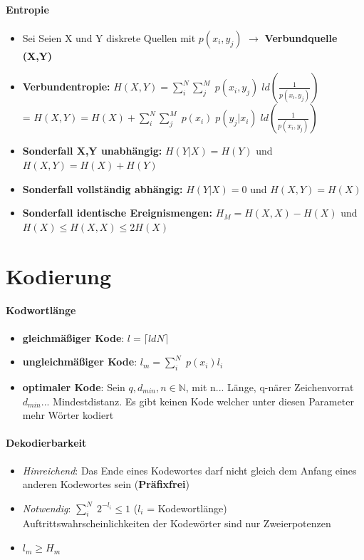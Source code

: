 \documentclass[12pt,a4paper]{article}
\begin{document}
\paragraph{Entropie\\}
\begin{itemize}
\item Sei Seien X und Y diskrete Quellen mit $p(x_i,y_j)$ $\rightarrow$ \textbf{Verbundquelle (X,Y)}
\item \textbf{Verbundentropie:} $H(X,Y) = \sum_i^N \sum_j^M \; p(x_i,y_j) \; ld(\frac{1}{p(x_i,y_j)})$\\
= $H(X,Y) = H(X) + \sum_i^N \sum_j^M \; p(x_i)\; p(y_j\vert x_i) \; ld(\frac{1}{p(x_i,y_j)})$
\item \textbf{Sonderfall X,Y unabhängig:} $H(Y\vert X) = H(Y)$ und $H(X,Y) = H(X) + H(Y)$
\item \textbf{Sonderfall vollständig abhängig:} $H(Y\vert  X) = 0$ und $H(X,Y) = H(X)$
\item \textbf{Sonderfall identische Ereignismengen:} $H_M = H(X,X) - H(X)$ und $H(X) \leq H(X,X) \leq 2H(X)$
\end{itemize}

\section{Kodierung}
\paragraph{Kodwortlänge\\}
\begin{itemize}
\item \textbf{gleichmäßiger Kode}: $l = \lceil ld N \rceil$
\item \textbf{ungleichmäßiger Kode}: $l_m = \sum_i^N \; p(x_i) l_i$
\item \textbf{optimaler Kode}: Sein $q, d_{min}, n \in \mathbb{N}$, mit n... Länge, q-närer Zeichenvorrat $d_{min}$... Mindestdistanz. Es gibt keinen Kode welcher unter diesen Parameter mehr Wörter kodiert
\end{itemize}

\paragraph{Dekodierbarkeit\\}
\begin{itemize}
\item \textit{Hinreichend}: Das Ende eines Kodewortes darf nicht gleich dem Anfang eines anderen Kodewortes sein (\textbf{Präfixfrei})
\item \textit{Notwendig}: $\sum_i^N \; 2^{-l_i} \leq 1$ ($l_i$ = Kodewortlänge)\\
Auftrittswahrscheinlichkeiten der Kodewörter sind nur Zweierpotenzen
\item $l_m \geq H_m$
\end{itemize}
\end{document}
